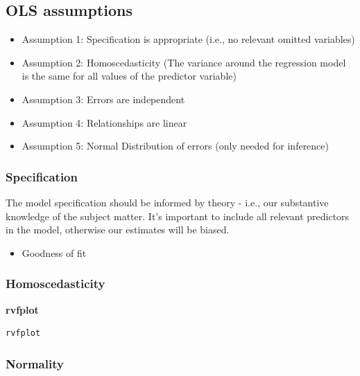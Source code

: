 \documentclass[
]{book}
\newenvironment{Shaded}{\begin{snugshade}}{\end{snugshade}}
\newcommand{\KeywordTok}[1]{\textcolor[rgb]{0.13,0.29,0.53}{\textbf{#1}}}
\providecommand{\tightlist}{%
  \setlength{\itemsep}{0pt}\setlength{\parskip}{0pt}}
\begin{document}
\hypertarget{ols-assumptions}{%
\subsection{OLS assumptions}\label{ols-assumptions}}

\begin{itemize}
\tightlist
\item
  Assumption 1: Specification is appropriate (i.e., no relevant omitted variables)
\item
  Assumption 2: Homoscedasticity (The variance around the regression model is the same for all values of the predictor variable)
\item
  Assumption 3: Errors are independent
\item
  Assumption 4: Relationships are linear
\item
  Assumption 5: Normal Distribution of errors (only needed for inference)
\end{itemize}

\hypertarget{specification}{%
\subsubsection{Specification}\label{specification}}

The model specification should be informed by theory - i.e., our substantive knowledge of the subject matter.
It's important to include all relevant predictors in the model, otherwise our estimates will be biased.

\begin{itemize}
\tightlist
\item
  Goodness of fit
\end{itemize}

\hypertarget{homoscedasticity}{%
\subsubsection{Homoscedasticity}\label{homoscedasticity}}

\begin{Shaded}
\begin{Highlighting}[]
  \KeywordTok{rvfplot}
\end{Highlighting}
\end{Shaded}

\begin{verbatim}
rvfplot
\end{verbatim}

\hypertarget{normality}{%
\subsubsection{Normality}\label{normality}}
\end{document}
